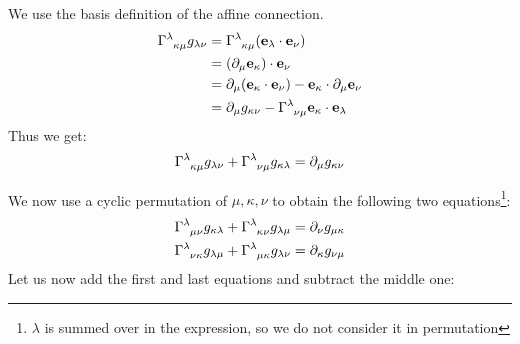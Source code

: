 We use the basis definition of the affine connection. 
\begin{align*}
    \tensor{\Gamma}{^\lambda _{\kappa \mu}}g_{\lambda\nu}&= \tensor{\Gamma}{^\lambda _{\kappa \mu}}(\veb{e}_\lambda \cdot \veb{e}_\nu) \\
    &= (\partial_{\mu}\veb{e}_\kappa)\cdot \veb{e}_\nu\\
    &=\partial_\mu(\veb{e}_\kappa \cdot \veb{e}_\nu)-\veb{e}_\kappa \cdot  \partial_{\mu}\veb{e}_\nu\\
    &=\partial_\mu g_{\kappa\nu} -  \tensor{\Gamma}{^\lambda _{\nu \mu}}\veb{e}_\kappa\cdot \veb{e}_\lambda
\end{align*}
Thus we get:
$$ \tensor{\Gamma}{^\lambda _{\kappa \mu}}g_{\lambda\nu} +\tensor{\Gamma}{^\lambda _{\nu \mu}}g_{\kappa\lambda} = \partial_\mu g_{\kappa\nu}$$
\begin{figure}[H]
    \centering 
    
\end{figure}
\noindent
We now use a cyclic permutation of $\mu, \kappa, \nu $ to obtain the following two equations\footnote{$\lambda$ is summed over in the expression, so we do not consider it in permutation}:
\begin{align*}
    \tensor{\Gamma}{^\lambda _{ \mu \nu}}g_{\kappa \lambda} +\tensor{\Gamma}{^\lambda _{\kappa \nu }}g_{\lambda \mu} &= \partial_\nu g_{\mu\kappa}\\
    \tensor{\Gamma}{^\lambda _{\nu \kappa }}g_{\lambda\mu} +\tensor{\Gamma}{^\lambda _{ \mu \kappa}}g_{\lambda \nu} &= \partial_\kappa g_{\nu\mu}
\end{align*}
Let us now add the first and last equations and subtract the middle one:

